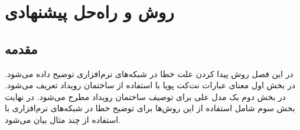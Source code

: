 \chapter{روش و راه‌حل پیشنهادی}
\section{مقدمه}
در این فصل روش پیدا کردن علت خطا در شبکه‌های نرم‌افزاری توضیح داده می‌شود.
در بخش اول معنای عبارات نت‌کت پویا با استفاده از ساختمان رویداد تعریف می‌شود.
در بخش دوم یک مدل علی برای توصیف ساختمان رویداد مطرح می‌شود.
در نهایت بخش سوم شامل استفاده از این روش‌ها برای توضیح خطا در شبکه‌های نرم‌افزاری با استفاده از چند مثال بیان می‌شود.





